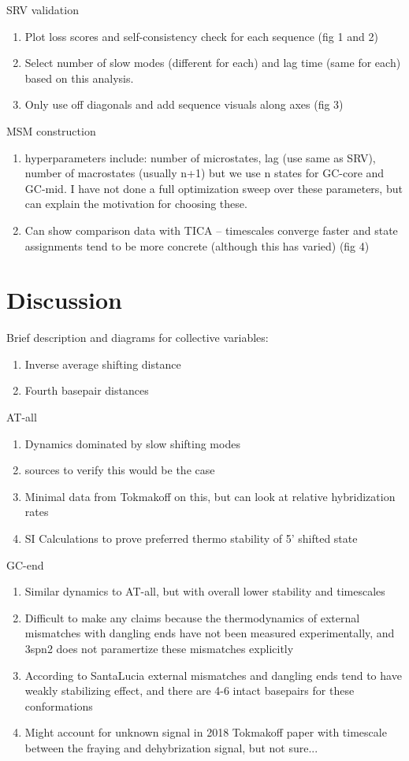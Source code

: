 \documentclass[journal=jpcbfk,manuscript=article]{achemso}
\begin{document}
SRV validation
\begin{enumerate}
	\item Plot loss scores and self-consistency check for each sequence (fig 1 and 2)
	\item Select number of slow modes (different for each) and lag time (same for each) based on this analysis.
	\item Only use off diagonals and add sequence visuals along axes (fig 3)
\end{enumerate}

MSM construction
\begin{enumerate}
	\item hyperparameters include: number of microstates, lag (use same as SRV), number of macrostates (usually n+1) but we use n states for GC-core and GC-mid. I have not done a full optimization sweep over these parameters, but can explain the motivation for choosing these.
    \item Can show comparison data with TICA -- timescales converge faster and state assignments tend to be more concrete (although this has varied) (fig 4)
\end{enumerate}  

\section{\label{sec:methods}Discussion}

Brief description and diagrams for collective variables:
\begin{enumerate}
	\item Inverse average shifting distance
	\item Fourth basepair distances
\end{enumerate} 

AT-all
\begin{enumerate}
	\item Dynamics dominated by slow shifting modes
	\item sources to verify this would be the case
	\item Minimal data from Tokmakoff on this, but can look at relative hybridization rates
	\item SI Calculations to prove preferred thermo stability of 5’ shifted state
\end{enumerate}  

GC-end
\begin{enumerate}
	\item Similar dynamics to AT-all, but with overall lower stability and timescales
	\item Difficult to make any claims because the thermodynamics of external mismatches with dangling ends have not been measured experimentally, and 3spn2 does not paramertize these mismatches explicitly
	\item According to SantaLucia external mismatches and dangling ends tend to have weakly stabilizing effect, and there are 4-6 intact basepairs for these conformations
	\item Might account for unknown signal in 2018 Tokmakoff paper with timescale between the fraying and dehybrization signal, but not sure... 
\end{enumerate}  
\end{document}
